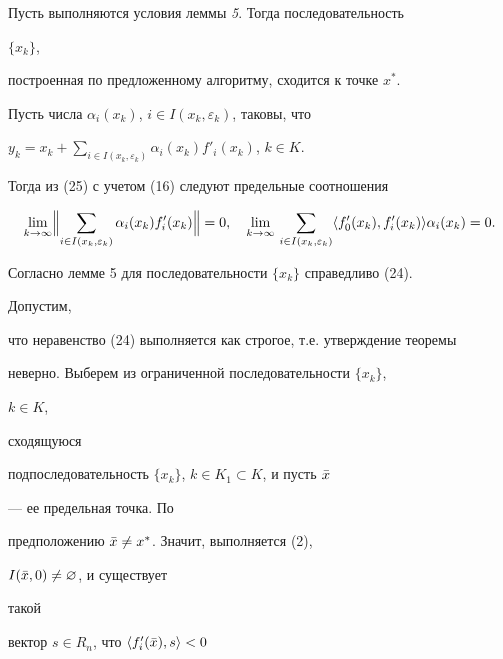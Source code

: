 \begin{thm}


Пусть выполняются условия леммы {\em 5}. Тогда последовательность


$\{x_k\}$,


построенная по предложенному алгоритму, сходится к точке $x^*$.


\end{thm}





\begin{pf}


Пусть числа $\alpha_i(x_k)$, $i\in I(x_k,\varepsilon_k)$, таковы, что


$y_k=x_k+\sum\limits_{i\in I(x_k,\varepsilon_k)}\alpha_i(x_k)


f'_i(x_k)$, $k\in K$.


Тогда из (25) с учетом (16) следуют предельные соотношения


\begin{equation}


\lim_{k\to\infty}\Bigl\|\sum_{i\in I(x_k,\varepsilon_k)}


\alpha_i(x_k)f'_i(x_k)\Bigr\|=0,\quad


\lim_{k\to\infty}\,\sum_{i\in I(x_k,\varepsilon_k)}


\la f'_0(x_k),f'_i(x_k)\ra


\alpha_i(x_k)=0.


\end{equation}





Согласно лемме 5 для последовательности $\{x_k\}$ справедливо (24).


Допустим,


что неравенство (24) выполняется как строгое, т.е. утверждение теоремы


неверно. Выберем из ограниченной последовательности $\{x_k\}$,


$k\in K$,


сходящуюся


подпоследовательность $\{x_k\}$, $k\in K_1\subset K$, и пусть $\Bar x$


--- ее предельная точка. По


предположению $\Bar x\ne x^*$. Значит, выполняется (2),


$I(\Bar x,0)\ne\varnothing$, и существует


такой


вектор $s\in R_n$, что $\langle f'_i(\Bar x),s\rangle<0$



\end{pf}
